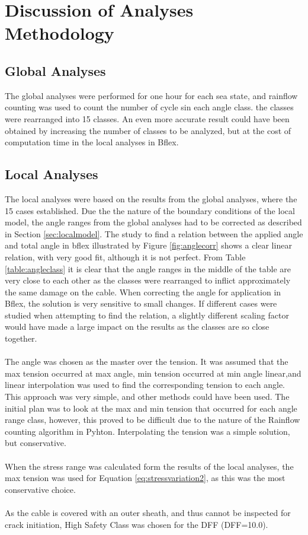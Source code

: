 \section{Discussion of Analyses Methodology}
\subsection{Global Analyses}
The global analyses were performed for one hour for each sea state, and rainflow counting was used to count the number of cycle sin each angle class. the classes were rearranged into 15 classes. An even more accurate result could have been obtained by increasing the number of classes to be analyzed, but at the cost of computation time in the local analyses in Bflex. 

 
\subsection{Local Analyses}
The local analyses were based on the results from the global analyses, where the 15 cases established. Due the the nature of the boundary conditions of the local model, the angle ranges from the global analyses had to be corrected as described in Section \ref{sec:localmodel}. The study to find a relation between the applied angle and total angle in bflex illustrated by Figure \ref{fig:anglecorr} shows a clear linear relation, with very good fit, although it is not perfect. From Table \ref{table:angleclass} it is clear that the angle ranges in the middle of the table are very close to each other as the classes were rearranged to inflict approximately the same damage on the cable. When correcting the angle for application in Bflex, the solution is very sensitive to small changes. If different cases were studied when attempting to find the relation, a slightly different scaling factor would have made a large impact on the results as the classes are so close together.\\\\
The angle was chosen as the master over the tension. It was assumed that the max tension occurred at max angle, min tension occurred at min angle linear,and linear interpolation was used to find the corresponding tension to each angle. This approach was very simple, and other methods could have been used. The initial plan was to look at the max and min tension that occurred for each angle range class, however, this proved to be difficult due to the nature of the Rainflow counting algorithm in Pyhton. Interpolating the tension was a simple solution, but conservative.\\\\
When the stress range was calculated form the results of the local analyses, the max tension was used for Equation \ref{eq:stressvariation2}, as this was the most conservative choice.\\\\ As the cable is covered with an outer sheath, and thus cannot be inspected for crack initiation, High Safety Class was chosen for the DFF (DFF=10.0). 
